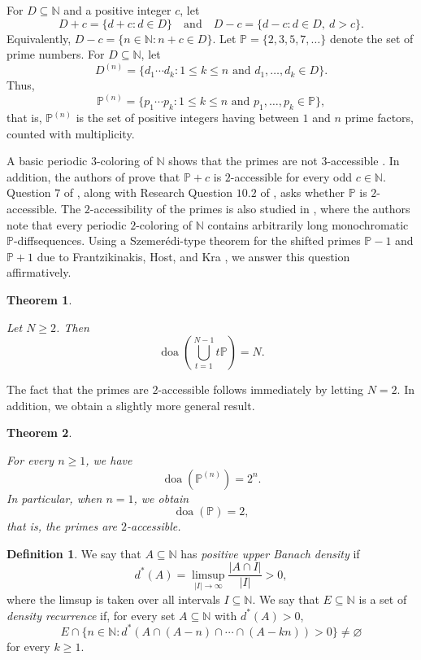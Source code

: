 \documentclass{amsart}
\newtheorem{theorem}{Theorem}
\theoremstyle{definition}
\newtheorem{definition}{Definition}
\begin{document}
For $D \subseteq \mathbb{N}$ and a positive integer $c$, let $$ D+c=\{d+c : d\in D\} \quad \text{and} \quad D-c=\{d-c : d \in D,\ d>c\}. $$ Equivalently, $D-c=\{n \in \mathbb{N} :n+c \in D\}$. Let $\mathbb{P}=\{2,3,5,7,\dots\}$ denote the set of prime numbers. For $D \subseteq \mathbb{N}$, let $$D^{(n)}=\{d_1\cdots d_k : 1 \leq k \leq n \text{ and } d_1,\dots,d_k \in D\}.$$ Thus, $$ \mathbb{P}^{(n)} = \{p_1 \cdots p_k : 1 \leq k \leq n \text{ and } p_1,\dots,p_k \in \mathbb{P}\}, $$ that is, $\mathbb{P}^{(n)}$ is the set of positive integers having between $1$ and $n$ prime factors, counted with multiplicity. 


A basic periodic $3$-coloring of $\mathbb{N}$ shows that the primes are not $3$-accessible \cite{landman2007avoiding}. In addition, the authors of \cite{landman2007avoiding} prove that $\mathbb{P}+c$ is $2$-accessible for every odd $c \in \mathbb{N}$. Question $7$ of \cite{landman2007avoiding}, along with Research Question $10.2$ of \cite{landman2014ramsey}, asks whether $\mathbb{P}$ is $2$-accessible. The $2$-accessibility of the primes is also studied in \cite{landman2010avoiding}, where the authors note that every periodic $2$-coloring of $\mathbb{N}$ contains arbitrarily long monochromatic $\mathbb{P}$-diffsequences. Using a Szemerédi-type theorem for the shifted primes $\mathbb{P}-1$ and $\mathbb{P}+1$ due to Frantzikinakis, Host, and Kra \cite{frantzikinakis2013polynomial}, we answer this question affirmatively.


\begin{theorem} \label{thm:D}

Let $N \geq 2$. Then $$\operatorname{doa}\left(\bigcup_{t=1}^{N-1}t\mathbb{P}\right)=N.$$

\end{theorem}

The fact that the primes are $2$-accessible follows immediately by letting $N=2$. In addition, we obtain a slightly more general result.

\begin{theorem}\label{thm:primes}

For every $n \geq 1$, we have $$\operatorname{doa}(\mathbb{P}^{(n)})=2^n.$$ In particular, when $n=1$, we obtain $$\operatorname{doa}(\mathbb{P})=2,$$ that is, the primes are $2$-accessible.
    
\end{theorem}
    

\begin{definition}

We say that $A \subseteq \mathbb{N}$ has \textit{positive upper Banach density} if $$d^*(A)=\limsup_{|I| \to \infty}\frac{|A \cap I|}{|I|}>0,$$ where the limsup is taken over all intervals $I \subseteq \mathbb{N}$. We say that $E \subseteq \mathbb{N}$ is a set of \textit{density recurrence} if, for every set $A \subseteq \mathbb{N}$ with $d^*(A)>0$, $$E \cap \{n \in \mathbb{N} : d^*\left(A \cap (A-n) \cap \cdots \cap (A-kn)\right)>0\} \neq \varnothing$$ for every $k \geq 1$.
    
\end{definition}
\end{document}
